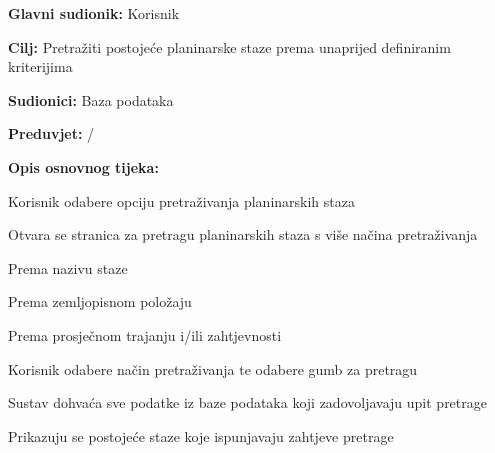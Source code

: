 			\noindent {}
		\begin{packed_item}
			
			\item \textbf{Glavni sudionik: }$ $Korisnik$ $
			\item  \textbf{Cilj:} $ $Pretražiti postojeće planinarske staze prema unaprijed definiranim kriterijima $ $
			\item  \textbf{Sudionici:} $ $Baza podataka$ $
			\item  \textbf{Preduvjet:} $ $/$ $
			\item  \textbf{Opis osnovnog tijeka:}
			
			\item[] \begin{packed_enum}
				
				\item $ $Korisnik odabere opciju pretraživanja planinarskih staza$ $
				\item $ $Otvara se stranica za pretragu planinarskih staza s više načina pretraživanja$ $
					\begin{packed_enum}
						\item Prema nazivu staze
						\item Prema zemljopisnom položaju
						\item Prema prosječnom trajanju i/ili zahtjevnosti
					\end{packed_enum}
				\item $ $Korisnik odabere način pretraživanja te odabere gumb za pretragu$ $
				\item $ $Sustav dohvaća sve podatke iz baze podataka koji zadovoljavaju upit pretrage $ $
				\item $ $Prikazuju se postojeće staze koje ispunjavaju zahtjeve pretrage$ $
				
			\end{packed_enum}
		\end{packed_item}
		
